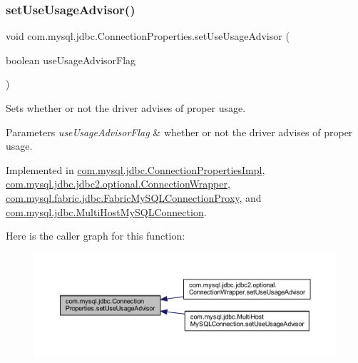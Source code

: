 \subsubsection{\texorpdfstring{set\+Use\+Usage\+Advisor()}{setUseUsageAdvisor()}}
{\footnotesize\ttfamily void com.\+mysql.\+jdbc.\+Connection\+Properties.\+set\+Use\+Usage\+Advisor (\begin{DoxyParamCaption}\item[{boolean}]{use\+Usage\+Advisor\+Flag }\end{DoxyParamCaption})}

Sets whether or not the driver advises of proper usage.


\begin{DoxyParams}{Parameters}
{\em use\+Usage\+Advisor\+Flag} & whether or not the driver advises of proper usage. \\
\hline
\end{DoxyParams}


Implemented in \mbox{\hyperlink{classcom_1_1mysql_1_1jdbc_1_1_connection_properties_impl_a4140fb151ca7b1288971b1ce6a1dc437}{com.\+mysql.\+jdbc.\+Connection\+Properties\+Impl}}, \mbox{\hyperlink{classcom_1_1mysql_1_1jdbc_1_1jdbc2_1_1optional_1_1_connection_wrapper_a1d58ba31c123593e3f79773f45777674}{com.\+mysql.\+jdbc.\+jdbc2.\+optional.\+Connection\+Wrapper}}, \mbox{\hyperlink{classcom_1_1mysql_1_1fabric_1_1jdbc_1_1_fabric_my_s_q_l_connection_proxy_a2969efbe839484628dff587d283603ca}{com.\+mysql.\+fabric.\+jdbc.\+Fabric\+My\+S\+Q\+L\+Connection\+Proxy}}, and \mbox{\hyperlink{classcom_1_1mysql_1_1jdbc_1_1_multi_host_my_s_q_l_connection_a7a7245490c0727f69175b55bb9d7c39b}{com.\+mysql.\+jdbc.\+Multi\+Host\+My\+S\+Q\+L\+Connection}}.

Here is the caller graph for this function\+:\nopagebreak
\begin{figure}[H]
\begin{center}
\leavevmode
\includegraphics[width=350pt]{interfacecom_1_1mysql_1_1jdbc_1_1_connection_properties_a8c6cb2052bdd1e63d3be6d2fcbd3908c_icgraph}
\end{center}
\end{figure}
\mbox{\label{interfacecom_1_1mysql_1_1jdbc_1_1_connection_properties_a985e00fab1822f34c53443de78f7f597}} 
